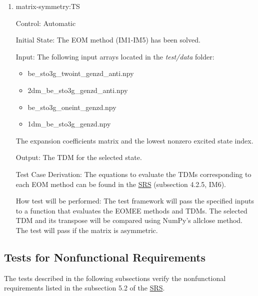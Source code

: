 \documentclass[12pt, titlepage]{article}
\begin{document}
\begin{enumerate}
	
	\item{matrix-symmetry:TS\\}
	
	Control: Automatic
	
	Initial State: The EOM method (IM1-IM5) has been solved.
	
	Input: The following input arrays located in the \textit{test/data} folder:
	\begin{itemize}
		\item be\_sto3g\_twoint\_genzd\_anti.npy
		\item 2dm\_be\_sto3g\_genzd\_anti.npy
		\item be\_sto3g\_oneint\_genzd.npy
		\item 1dm\_be\_sto3g\_genzd.npy
	\end{itemize}
	The expansion coefficients matrix and the lowest nonzero excited state 
	index. 
	
	Output: The TDM for the selected state.
	
	Test Case Derivation: The equations to evaluate the TDMs corresponding to 
	each EOM method can be found in the 
	\href{https://github.com/gabrielasd/eomee/tree/cas741/docs/SRS} 
	{SRS} (subsection 4.2.5, IM6).
	
	How test will be performed: 
	The test framework will pass the specified inputs to a function that 
	evaluates the EOMEE methods and TDMs. The selected TDM and its transpose 
	will be compared using NumPy's allclose method. The test will pass if the 
	matrix is asymmetric.
	
%	
%	
%	
%	
%	
%	
	
\end{enumerate}


\subsection{Tests for Nonfunctional Requirements}

%
The tests described in the following subsections verify the nonfunctional 
requirements listed in the subsection 5.2 of the 
\href{https://github.com/gabrielasd/eomee/tree/cas741/docs/SRS} {SRS}.
\end{document}
